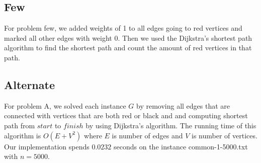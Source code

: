 \documentclass{tufte-handout}
\begin{document}
\subsection{Few}

For problem few, we added weights of 1 to all edges going to red vertices and marked all other edges with weight 0. Then we used the Dijkstra's shortest path algorithm to find the shortest path and count the amount of red vertices in that path.

\subsection{Alternate}

For problem A, we solved each instance $G$ by removing all edges that are connected with vertices that are both red or black and and computing shortest path from $start$ to $finish$ by using Dijkstra's algorithm.
The running time of this algorithm is $O(E + V^2)$ where  $E$ is number of edges and $V$ is number of vertices. Our implementation spends $0.0232$ seconds on the instance common-1-5000.txt with $n = 5000$.
\end{document}
